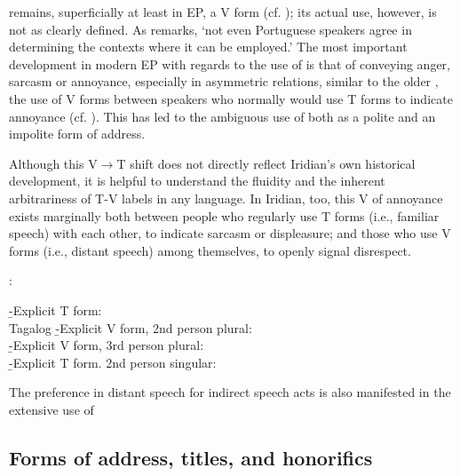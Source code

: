 {{				 remains, superficially at least in EP, a V form (cf. \cite[85]{ganhoport}); its actual use, however, is not as clearly defined. As \textcite{laraport} remarks, `not even Portuguese speakers agree in determining the contexts where it can be employed.' The most important development in modern EP with regards to the use of  is that of conveying anger, sarcasm or annoyance, especially in asymmetric relations, similar to the older , the use of V forms between speakers who normally would use T forms to indicate annoyance (cf. \cite{hummelport}). This has led to the ambiguous use of  both as a polite and an impolite form of address.

				Although this V$\rightarrow$T shift does not directly reflect Iridian's own historical development, it is helpful to understand the fluidity and the inherent arbitrariness of T-V labels in any language. In Iridian, too, this V of annoyance exists marginally both between people who regularly use T forms (i.e., familiar speech) with each other, to indicate sarcasm or displeasure; and those who use V forms (i.e., distant speech) among themselves, to openly signal disrespect.
			}:\\
				 }
			\b{-}{Explicit T form:\\
				 }
		\endsubsub
	\a Tagalog
		\beginsubsub
			\b{-}{Explicit V form, 2nd person plural:\\
				 }
			\b{-}{Explicit V form, 3rd person plural:\\
				 }
			\b{-}{Explicit T form. 2nd person singular:\\
				 }
		\endsubsub
\xe

The preference in distant speech for indirect speech acts is also manifested in the extensive use of 

\subsection{Forms of address, titles, and honorifics}


